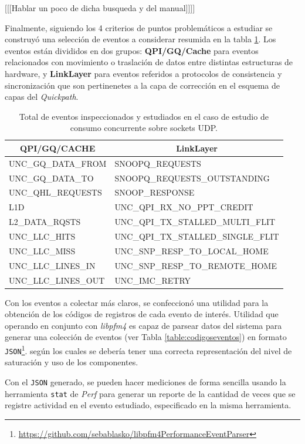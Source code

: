 [[[Hablar un poco de dicha busqueda y del manual]]]]

Finalmente, siguiendo los 4 criterios de puntos problemáticos a estudiar se construyó una selección de eventos a considerar resumida en la tabla \ref{table:eventos}. Los eventos están divididos en dos grupos: \textbf{QPI/GQ/Cache} para eventos relacionados con movimiento o traslación de datos entre distintas estructuras de hardware, y \textbf{LinkLayer} para eventos referidos a protocolos de consistencia y sincronización que son pertinenetes a la capa de corrección en el esquema de capas del \emph{Quickpath}.

\begin{table}[h!]
\centering
\begin{tabular}{l|l}
\multicolumn{1}{c|}{{\bf QPI/GQ/CACHE}} & \multicolumn{1}{c}{{\bf LinkLayer}} \\ \hline
{ UNC\_GQ\_DATA\_FROM} & SNOOPQ\_REQUESTS \\
{ UNC\_GQ\_DATA\_TO} & SNOOPQ\_REQUESTS\_OUTSTANDING \\
{ UNC\_QHL\_REQUESTS} & SNOOP\_RESPONSE \\
{ L1D} & UNC\_QPI\_RX\_NO\_PPT\_CREDIT \\
{ L2\_DATA\_RQSTS} & UNC\_QPI\_TX\_STALLED\_MULTI\_FLIT \\
{ UNC\_LLC\_HITS} & UNC\_QPI\_TX\_STALLED\_SINGLE\_FLIT \\
{ UNC\_LLC\_MISS} & UNC\_SNP\_RESP\_TO\_LOCAL\_HOME \\
{ UNC\_LLC\_LINES\_IN} & UNC\_SNP\_RESP\_TO\_REMOTE\_HOME \\
{ UNC\_LLC\_LINES\_OUT} & UNC\_IMC\_RETRY
\end{tabular}
\caption{Total de eventos inspeccionados y estudiados en el caso de estudio de consumo concurrente sobre sockets UDP.}
\label{table:eventos}
\end{table}

Con los eventos a colectar más claros, se confeccionó una utilidad para la obtención de los códigos de registros de cada evento de interés. Utilidad que operando en conjunto con \emph{libpfm4} es capaz de parsear datos del sistema para generar una colección de eventos (ver Tabla \ref{table:codigoseventos}) en formato \verb=JSON=\footnote{\url{https://github.com/sebablasko/libpfm4PerformanceEventParser}}. según los cuales se debería tener una correcta representación del nivel de saturación y uso de los componentes.

Con el \verb=JSON= generado, se pueden hacer mediciones de forma sencilla usando la herramienta \verb=stat= de \emph{Perf} para generar un reporte de la cantidad de veces que se registre actividad en el evento estudiado, especificado en la misma herramienta.

